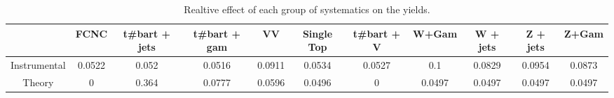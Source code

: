 \begin{table}[htbp]
\begin{center}
\begin{tabular}{|c|c|c|c|c|c|c|c|c|c|c|}
\hline 
      & FCNC      & t#bar{t} + jets      & t#bar{t} +  gam      & VV      & Single Top      & t#bar{t} + V      & W+Gam      & W + jets      & Z + jets      & Z+Gam \\ 
\hline 
 Instrumental & 0.0522 & 0.052 & 0.0516 & 0.0911 & 0.0534 & 0.0527 & 0.1 & 0.0829 & 0.0954 & 0.0873 \\ 
 Theory & 0 & 0.364 & 0.0777 & 0.0596 & 0.0496 & 0 & 0.0497 & 0.0497 & 0.0497 & 0.0497 \\ 
\hline 
\end{tabular} 
\caption{Realtive effect of each group of systematics on the yields.} 
\end{center} 
\end{table} 
